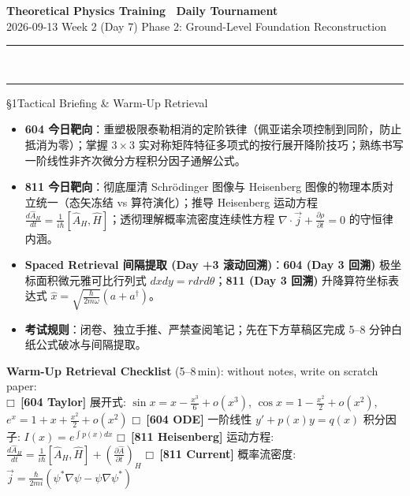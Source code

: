 \documentclass[a4paper,11pt]{article}
\newcommand{\checkbox}{\ensuremath{\mdlgwhtsquare}}
\newcommand{\alerttag}[1]{\textcolor{wine}{\sffamily\bfseries [#1]}}
\begin{document}
\begin{center}
  {\LARGE\bfseries\color{navy} Theoretical Physics Training \textperiodcentered\ Daily Tournament}\\[3pt]
  {\small\sffamily\color{mist} 2026-09-13 \quad\textbar\quad Week 2 (Day 7) \quad\textbar\quad Phase 2: Ground-Level Foundation Reconstruction}\\[-4pt]
  {\color{navy}\rule{\textwidth}{0.8pt}}\\[-11pt]
  {\color{border}\rule{\textwidth}{0.3pt}}
\end{center}

\vspace{-6pt}

\begin{briefing}{\S 1\quad Tactical Briefing \& Warm-Up Retrieval}
\begin{itemize}[leftmargin=1.5em, itemsep=2pt, topsep=1pt]
  \item \textbf{604 今日靶向}：重塑极限泰勒相消的定阶铁律（佩亚诺余项控制到同阶，防止抵消为零）；掌握 $3\times 3$ 实对称矩阵特征多项式的按行展开降阶技巧；熟练书写一阶线性非齐次微分方程积分因子通解公式。
  \item \textbf{811 今日靶向}：彻底厘清 Schrödinger 图像与 Heisenberg 图像的物理本质对立统一（态矢冻结 vs 算符演化）；推导 Heisenberg 运动方程 $\frac{d\hat{A}_H}{dt} = \frac{1}{i\hbar}[\hat{A}_H, \hat{H}]$；透彻理解概率流密度连续性方程 $\nabla \cdot \vec{j} + \frac{\partial \rho}{\partial t} = 0$ 的守恒律内涵。
  \item \textbf{Spaced Retrieval 间隔提取 (Day +3 滚动回溯)}：\textbf{604 (Day 3 回溯)} 极坐标面积微元雅可比行列式 $dxdy = rdrd\theta$；\textbf{811 (Day 3 回溯)} 升降算符坐标表达式 $\hat{x} = \sqrt{\frac{\hbar}{2m\omega}}(a+a^\dagger)$。
  \item \textbf{考试规则}：闭卷、独立手推、严禁查阅笔记；先在下方草稿区完成 5--8 分钟白纸公式破冰与间隔提取。
\end{itemize}

\vspace{1mm}
\textbf{Warm-Up Retrieval Checklist} (5--8\,min): without notes, write on scratch paper:\\
\checkbox\ \alerttag{604 Taylor} 展开式: $\sin x = x - \frac{x^3}{6} + o(x^3)$, $\cos x = 1 - \frac{x^2}{2} + o(x^2)$, $e^x = 1 + x + \frac{x^2}{2} + o(x^2)$ \quad
\checkbox\ \alerttag{604 ODE} 一阶线性 $y' + p(x)y = q(x)$ 积分因子: $I(x) = e^{\int p(x)dx}$ \quad
\checkbox\ \alerttag{811 Heisenberg} 运动方程: $\frac{d\hat{A}_H}{dt} = \frac{1}{i\hbar}[\hat{A}_H, \hat{H}] + \left(\frac{\partial\hat{A}}{\partial t}\right)_H$ \quad
\checkbox\ \alerttag{811 Current} 概率流密度: $\vec{j} = \frac{\hbar}{2mi}(\psi^* \nabla \psi - \psi \nabla \psi^*)$
\end{briefing}
\end{document}
